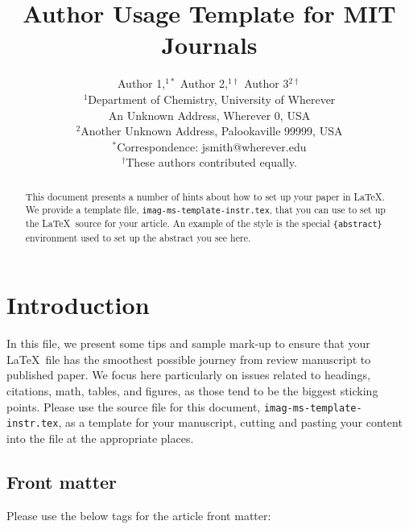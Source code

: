 \documentclass[]{imag-ms-template}
\title{Author Usage Template for MIT Journals}
\author{
    Author 1,$^{1\ast}$
    Author 2,$^{1\dag}$
    Author 3$^{2\dag}$
\\
{\small $^{1}$Department of Chemistry, University of Wherever}\\
{\small An Unknown Address, Wherever 0, USA}\\
{\small $^{2}$Another Unknown Address, Palookaville 99999, USA}\\
{\small $^\ast$Correspondence: jsmith@wherever.edu}\\
{\small $^\dag$These authors contributed equally.}\\
}
\theoremstyle{plain}
\theoremstyle{remark}
\begin{document}
\maketitle
\begin{abstract}
This document presents a number of hints about how to set up your paper
in \LaTeX. We provide a template file,
\texttt{imag-ms-template-instr.tex}, that you can use to set up the
\LaTeX~source for your article. An example of the style is the special
\texttt{\{abstract\}} environment used to set up the abstract you see
here.
\end{abstract}

\section{Introduction}\label{introduction}

In this file, we present some tips and sample mark-up to ensure that
your \LaTeX~file has the smoothest possible journey from review
manuscript to published paper. We focus here particularly on issues
related to headings, citations, math, tables, and figures, as those tend
to be the biggest sticking points. Please use the source file for this
document, \texttt{imag-ms-template-instr.tex}, as a template for your
manuscript, cutting and pasting your content into the file at the
appropriate places.

\newpage{}

\subsection{Front matter}\label{front-matter}

Please use the below tags for the article front matter:
\end{document}

